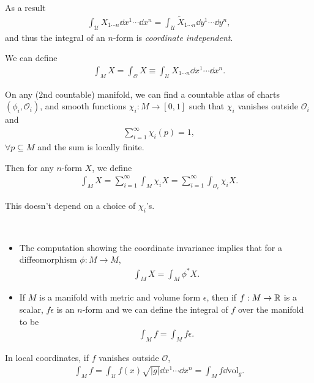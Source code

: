 As a result
\begin{align}
    \int_{\mathcal{U}} X_{1 \cdots n} \dd{x}^{1} \cdots \dd{x}^{n} = \int_\mathcal{U} \widetilde{X}_{1 \cdots n} \dd{y}^{1} \cdots \dd{y}^{n}
,\end{align}
and thus the integral of an $n$-form is \textit{coordinate independent}.

We can define
\begin{align}
    \int_M X = \int_{\mathcal{O}} X \equiv \int_{\mathcal{U}} X_{1\cdots n} \dd{x}^{1} \cdots \dd{x}^{n}
.\end{align}

On any ($2$nd countable) manifold, we can find a countable atlas of charts $\left( \phi_i, \mathcal{O}_i \right) $, and smooth functions $\chi_i : M \to \left[ 0,1 \right] $ such that $\chi_i$ vanishes outside $\mathcal{O}_i$ and
\begin{align}
    \sum_{i=1}^{\infty}  \chi_i \left( p \right)  = 1
,\end{align}
$\forall p \subseteq M$ and the sum is locally finite.

Then for any $n$-form $X$, we define
\begin{align}
    \int_M X = \sum_{i=1}^{\infty} \int_{M} \chi_i X  = \sum_{i=1}^{\infty}  \int_{\mathcal{O}_i} \chi_i X
.\end{align}

This doesn't depend on a choice of $\chi_i$'s.

\begin{notes}~
    \begin{itemize}
        \item The computation showing the coordinate invariance implies that for a diffeomorphism $\phi : M \to M$,
            \begin{align}
                \int_M X = \int_M \phi^{*} X
            .\end{align}
        \item If $M$ is a manifold with metric and volume form $\epsilon$, then if $f : M \to \mathbb{R}$ is a scalar, $f \epsilon$ is an $n$-form and we can define the integral of $f$ over the manifold to be
            \begin{align}
                \int_M f = \int_M f \epsilon
            .\end{align}
    \end{itemize}
\end{notes}

In local coordinates, if $f$ vanishes outside $\mathcal{O}$,
\begin{align}
    \int_{M} f = \int_\mathcal{U} f\left( x \right) \sqrt{\left| g \right| } \dd{x}^1 \cdots \dd{x}^{n} = \int_{M} f \dd{\text{vol}}_g
.\end{align}

